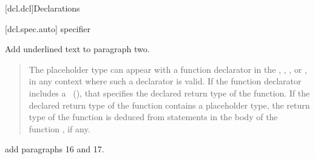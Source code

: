 
\setcounter{chapter}{6}
[dcl.dcl]{Declarations}

\setcounter{section}{1}
\setcounter{subsection}{5}
\setcounter{subsubsection}{3}
[dcl.spec.auto]{ specifier}

Add underlined text to paragraph two.

\begin{quote}
\setcounter{Paras}{1}
\pnum
The placeholder type can appear with a function declarator in the
, ,
, or ,
in any context where such a declarator is valid. If the function declarator
includes a ~(), that specifies
the declared return type of the function. If the declared return type of the
function contains a placeholder type, the return type of the function is
deduced from  statements in the body of the function , if any.
\end{quote}

add paragraphs 16 and 17.

